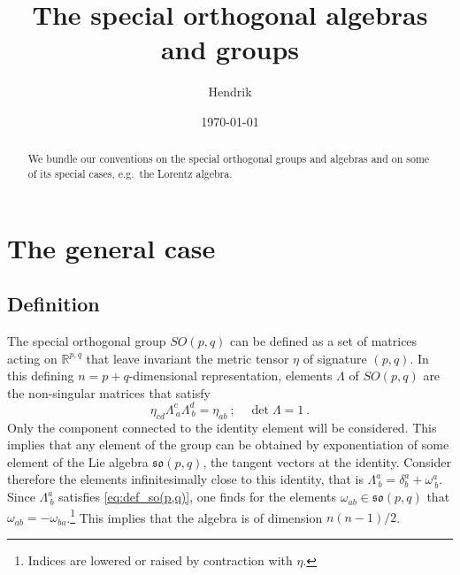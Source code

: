 \documentclass[10pt]{amsart}
\title{The special orthogonal algebras and groups}
\author{Hendrik}
\date{\today}
\numberwithin{equation}{section}
\begin{document}
\begin{abstract}
	We bundle our conventions on the special orthogonal groups and 
	algebras and on some of its special cases, e.g.~the Lorentz 
	algebra.
\end{abstract}

\maketitle

\section{The general case}

\subsection{Definition}

The special orthogonal group $SO(p,q)$ can be defined as a set of 
matrices acting on $\mathbb{R}^{p,q}$ that leave invariant the 
metric tensor $\eta$ of signature $(p,q)$. In this defining $n = 
p+q$-dimensional representation, elements $\Lambda$ of $SO(p,q)$ 
are the non-singular matrices that satisfy 
%
\begin{equation}\label{eq:def_so(p,q)}
	\eta_{cd}\Lambda^c_{~a}\Lambda^d_{~b} = \eta_{ab}~;
	\quad \det\Lambda = 1~.
\end{equation}
Only the component connected to the identity element will be 
considered. This implies that any element of the group can be 
obtained by exponentiation of some element of the Lie algebra 
$\mathfrak{so}(p,q)$, the tangent vectors at the identity.  
Consider therefore the elements infinitesimally close to this 
identity, that is $\Lambda^a_{~b} = \delta^a_b + \omega^a_{~b}$.  
Since $\Lambda^a_{~b}$ satisfies \eqref{eq:def_so(p,q)}, one 
finds for the elements $\omega_{ab} \in \mathfrak{so}(p,q)$ that 
$\omega_{ab} = -\omega_{ba}$.\footnote{Indices are lowered or 
	raised by contraction with $\eta$.} This implies that the 
algebra is of dimension $n(n-1)/2$.
\end{document}
